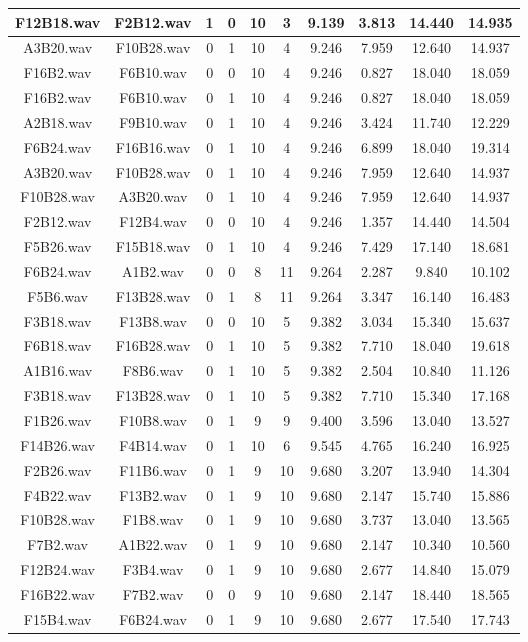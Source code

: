 \documentclass[11pt,a4paper]{book}
\begin{document}
\begin{longtable}[c]{|c|c|c|c|c|c|c|c|c|c|}
F12B18.wav&F2B12.wav&1&0&10&3&9.139&3.813&14.440&14.935\\ \hline
A3B20.wav&F10B28.wav&0&1&10&4&9.246&7.959&12.640&14.937\\ \hline
F16B2.wav&F6B10.wav&0&0&10&4&9.246&0.827&18.040&18.059\\ \hline
F16B2.wav&F6B10.wav&0&1&10&4&9.246&0.827&18.040&18.059\\ \hline
A2B18.wav&F9B10.wav&0&1&10&4&9.246&3.424&11.740&12.229\\ \hline
F6B24.wav&F16B16.wav&0&1&10&4&9.246&6.899&18.040&19.314\\ \hline
A3B20.wav&F10B28.wav&0&1&10&4&9.246&7.959&12.640&14.937\\ \hline
F10B28.wav&A3B20.wav&0&1&10&4&9.246&7.959&12.640&14.937\\ \hline
F2B12.wav&F12B4.wav&0&0&10&4&9.246&1.357&14.440&14.504\\ \hline
F5B26.wav&F15B18.wav&0&1&10&4&9.246&7.429&17.140&18.681\\ \hline
F6B24.wav&A1B2.wav&0&0&8&11&9.264&2.287&9.840&10.102\\ \hline
F5B6.wav&F13B28.wav&0&1&8&11&9.264&3.347&16.140&16.483\\ \hline
F3B18.wav&F13B8.wav&0&0&10&5&9.382&3.034&15.340&15.637\\ \hline
F6B18.wav&F16B28.wav&0&1&10&5&9.382&7.710&18.040&19.618\\ \hline
A1B16.wav&F8B6.wav&0&1&10&5&9.382&2.504&10.840&11.126\\ \hline
F3B18.wav&F13B28.wav&0&1&10&5&9.382&7.710&15.340&17.168\\ \hline
F1B26.wav&F10B8.wav&0&1&9&9&9.400&3.596&13.040&13.527\\ \hline
F14B26.wav&F4B14.wav&0&1&10&6&9.545&4.765&16.240&16.925\\ \hline
F2B26.wav&F11B6.wav&0&1&9&10&9.680&3.207&13.940&14.304\\ \hline
F4B22.wav&F13B2.wav&0&1&9&10&9.680&2.147&15.740&15.886\\ \hline
F10B28.wav&F1B8.wav&0&1&9&10&9.680&3.737&13.040&13.565\\ \hline
F7B2.wav&A1B22.wav&0&1&9&10&9.680&2.147&10.340&10.560\\ \hline
F12B24.wav&F3B4.wav&0&1&9&10&9.680&2.677&14.840&15.079\\ \hline
F16B22.wav&F7B2.wav&0&0&9&10&9.680&2.147&18.440&18.565\\ \hline
F15B4.wav&F6B24.wav&0&1&9&10&9.680&2.677&17.540&17.743\\ \hline

\end{longtable}
\end{document}
